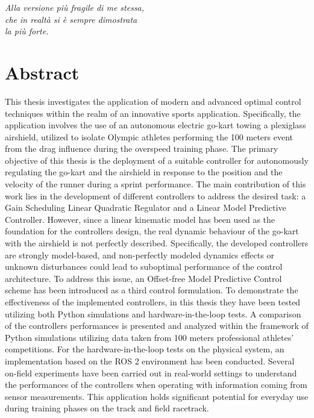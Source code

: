 \documentclass[a4paper,12pt,oneside]{book}
\begin{document}
\vfill




\newpage
\thispagestyle{empty}
\mbox{}
\begin{center}   
	\vspace{40mm}
\end{center}

\begin{flushright}
\textit{
Alla versione più fragile di me stessa, \\
che in realtà si è sempre dimostrata \\
la più forte.}
\end{flushright} 

%
\newpage
\thispagestyle{empty}
\mbox{}

\newpage
\thispagestyle{empty}


\chapter*{Abstract}
This thesis investigates the application of modern and advanced optimal control techniques within the realm of an innovative sports application. 
Specifically, the application involves the use of an autonomous electric go-kart towing a plexiglass airshield, utilized to isolate Olympic athletes performing the 100 meters event from the drag influence during the overspeed training phase. 
The primary objective of this thesis is the deployment of a suitable controller for autonomously regulating the go-kart and the airshield in response to the position and the velocity of the runner during a sprint performance. 
The main contribution of this work lies in the development of different controllers to address the desired task: a Gain Scheduling Linear Quadratic Regulator and a Linear Model Predictive Controller. 
However, since a linear kinematic model has been used as the foundation for the controllers design, the real dynamic behaviour of the go-kart with the airshield is not perfectly described.
Specifically, the developed controllers are strongly model-based, and non-perfectly modeled dynamics effects or unknown disturbances could lead to suboptimal performance of the control architecture.  
To address this issue, an Offset-free Model Predictive Control scheme has been introduced as a third control formulation. 
To demonstrate the effectiveness of the implemented controllers, in this thesis they have been tested utilizing both Python simulations and hardware-in-the-loop tests.
A comparison of the controllers performances is presented and analyzed within the framework of Python simulations utilizing data taken from 100 meters professional athletes' competitions. 
For the hardware-in-the-loop tests on the physical system, an implementation based on the ROS 2 environment has been conducted. 
Several on-field experiments have been carried out in real-world settings to understand the performances of the controllers when operating with information coming from sensor measurements. 
This application holds significant potential for everyday use during training phases on the track and field racetrack.
\end{document}
